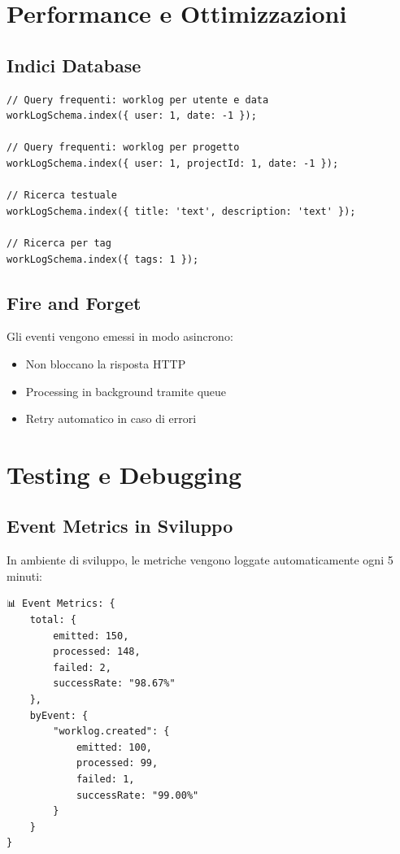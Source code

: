 \documentclass[11pt,a4paper]{article}
\begin{document}
\section{Performance e Ottimizzazioni}

\subsection{Indici Database}

\begin{lstlisting}[caption=Indici WorkLog]
// Query frequenti: worklog per utente e data
workLogSchema.index({ user: 1, date: -1 });

// Query frequenti: worklog per progetto
workLogSchema.index({ user: 1, projectId: 1, date: -1 });

// Ricerca testuale
workLogSchema.index({ title: 'text', description: 'text' });

// Ricerca per tag
workLogSchema.index({ tags: 1 });
\end{lstlisting}

\subsection{Fire and Forget}

Gli eventi vengono emessi in modo asincrono:
\begin{itemize}
    \item Non bloccano la risposta HTTP
    \item Processing in background tramite queue
    \item Retry automatico in caso di errori
\end{itemize}

\section{Testing e Debugging}

\subsection{Event Metrics in Sviluppo}

In ambiente di sviluppo, le metriche vengono loggate automaticamente ogni 5 minuti:

\begin{lstlisting}[caption=Log Metriche]
📊 Event Metrics: {
    total: {
        emitted: 150,
        processed: 148,
        failed: 2,
        successRate: "98.67%"
    },
    byEvent: {
        "worklog.created": {
            emitted: 100,
            processed: 99,
            failed: 1,
            successRate: "99.00%"
        }
    }
}
\end{lstlisting}
\end{document}
